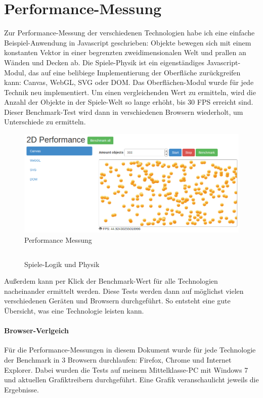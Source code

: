 \documentclass[a4paper, 12pt]{article}
\begin{document}
\section{Performance-Messung}
Zur Performance-Messung der verschiedenen Technologien habe ich eine einfache Beispiel-Anwendung in Javascript geschrieben: Objekte bewegen sich mit einem konstanten Vektor in einer begrenzten zweidimensionalen Welt und prallen an Wänden und Decken ab. Die Spiele-Physik ist ein eigenständiges Javascript-Modul, das auf eine belibiege Implementierung der Oberfläche zurückgreifen kann: Canvas, WebGL, SVG oder DOM. Das Oberflächen-Modul wurde für jede Technik neu implementiert. Um einen vergleichenden Wert zu ermitteln, wird die Anzahl der Objekte in der Spiele-Welt so lange erhöht, bis 30 FPS erreicht sind. Dieser Benchmark-Test wird dann in verschiedenen Browsern wiederholt, um Unterschiede zu ermitteln.
\begin{figure}[h!]
	\begin{center}
		\includegraphics[width=\textwidth]{assets/demo_screenshot.png} 
	\end{center}
	\caption{Performance Messung}
	\label{performance_benchmark}
\end{figure}
\begin{figure}[h!]
	\inputminted{javascript}{assets/benchmark1.js}
	\caption{Spiele-Logik und Physik}
	\label{benchmark1}
	\newpage
\end{figure}
Außerdem kann per Klick der Benchmark-Wert für alle Technologien nacheinander ermittelt werden. Diese Tests werden dann auf möglichst vielen verschiedenen Geräten und Browsern durchgeführt. So entsteht eine gute Übersicht, was eine Technologie leisten kann.
\paragraph{Browser-Verlgeich} Für die Performance-Messungen in diesem Dokument wurde für jede Technologie der Benchmark in 3 Browsern durchlaufen: Firefox, Chrome und Internet Explorer. Dabei wurden die Tests auf meinem Mittelklasse-PC mit Windows 7 und aktuellen Grafiktreibern durchgeführt. Eine Grafik veranschaulicht jeweils die Ergebnisse.
\newpage
\end{document}
